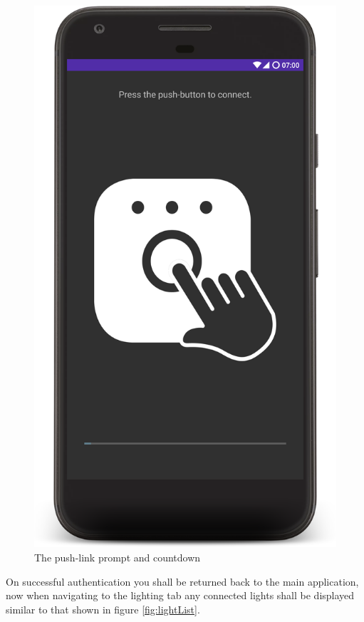\begin{figure}[H]
  \centering
  \includegraphics[scale=0.09]{Images/pushLinkScreen.png}
  \caption{The push-link prompt and countdown}
  \label{fig:pushPrompt}
\end{figure}

On successful authentication you shall be returned back to the main
application, now when navigating to the lighting tab any connected
lights shall be displayed similar to that shown in figure
\ref{fig:lightList}.

